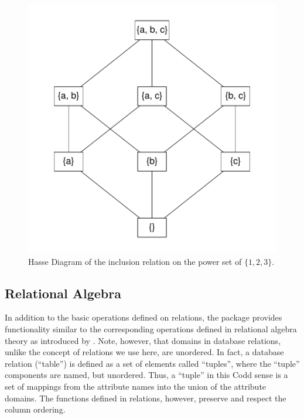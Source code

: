 \documentclass[fleqn]{article}
\newcommand{\pkg}[1]{{\normalfont\fontseries{b}\selectfont #1}}
\newcommand{\dQuote}[1]{``{#1}''}
\begin{document}
\begin{figure}[h]
\begin{center}
\includegraphics{relations-plotfig}
\caption{Hasse Diagram of the inclusion relation on the power set of
  $\{1,2,3\}$.}
\label{fig:plot}
\end{center}
\end{figure}

\subsection{Relational Algebra}

In addition to the basic operations defined on relations,
the package provides functionality similar to the corresponding
operations defined in relational algebra theory as introduced by
\cite{ranking:Codd:1970}.
Note, however, that domains in database relations, unlike the
concept of relations we use here, are unordered.  In fact, a database
relation (\dQuote{table}) is defined as a set of elements called
\dQuote{tuples}, where the \dQuote{tuple} components are named, but
unordered.  Thus, a \dQuote{tuple} in this Codd sense is a set of
mappings from the attribute names into the union of the attribute
domains.  The functions defined in \pkg{relations}, however, preserve
and respect the column ordering.
\end{document}

